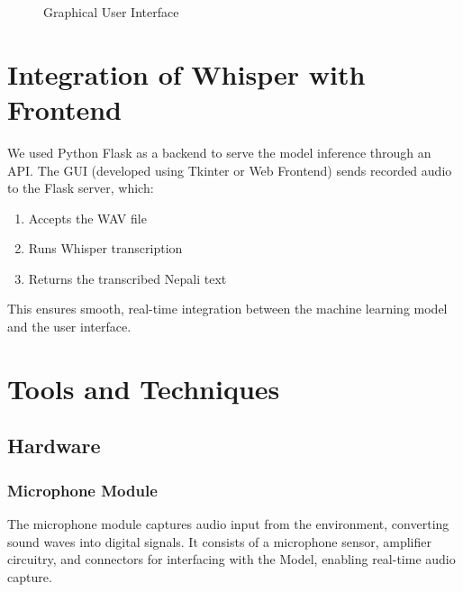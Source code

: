 \begin{figure}[H]
	\centering
	\caption{Graphical User Interface}
	\label{fig:GUI}
\end{figure}

\section{Integration of Whisper with Frontend}
We used Python Flask as a backend to serve the model inference through an API. The GUI (developed using Tkinter or Web Frontend) sends recorded audio to the Flask server, which:
\begin{enumerate}
    \item Accepts the WAV file
    \item Runs Whisper transcription
    \item Returns the transcribed Nepali text
\end{enumerate}

This ensures smooth, real-time integration between the machine learning model and the user interface.



\section{Tools and Techniques}
\subsection{Hardware}
\subsubsection{Microphone Module}
The microphone module captures audio input from the environment, converting sound waves into digital signals. It consists of a microphone sensor, amplifier circuitry, and connectors for interfacing with the Model, enabling real-time audio capture.

